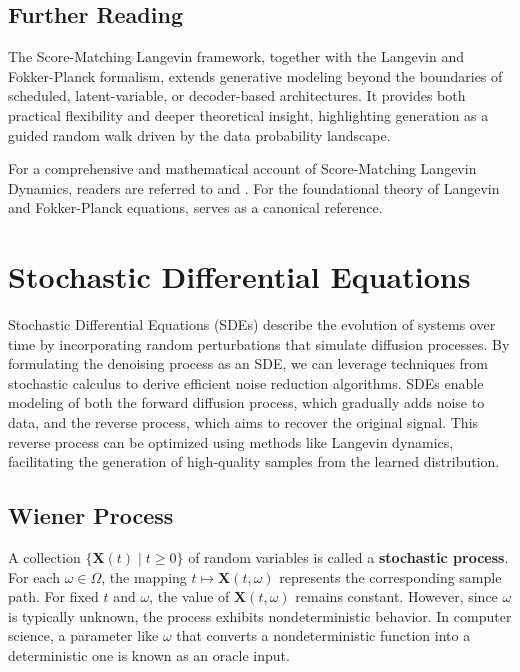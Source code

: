 \documentclass{article}
\newcommand{\X}{\mathbf{X}}
\begin{document}
	\subsection{Further Reading}
	
	The Score-Matching Langevin framework, together with the Langevin and Fokker-Planck formalism, extends generative modeling beyond the boundaries of scheduled, latent-variable, or decoder-based architectures. It provides both practical flexibility and deeper theoretical insight, highlighting generation as a guided random walk driven by the data probability landscape.
	
	For a comprehensive and mathematical account of Score-Matching Langevin Dynamics, readers are referred to \cite{vincent2011} and \cite{yang2019}. For the foundational theory of Langevin and Fokker-Planck equations, \cite{risken1989} serves as a canonical reference.
	
	\section{Stochastic Differential Equations}
	
	Stochastic Differential Equations (SDEs) describe the evolution of systems over time by incorporating random perturbations that simulate diffusion processes. By formulating the denoising process as an SDE, we can leverage techniques from stochastic calculus to derive efficient noise reduction algorithms. SDEs enable modeling of both the forward diffusion process, which gradually adds noise to data, and the reverse process, which aims to recover the original signal. This reverse process can be optimized using methods like Langevin dynamics, facilitating the generation of high-quality samples from the learned distribution.
	
	\subsection*{Wiener Process}
	
	A collection $\{\X(t) \mid t \geq 0\}$ of random variables is called a \textbf{stochastic process}. For each $\omega \in \Omega$, the mapping $t \mapsto \X(t, \omega)$ represents the corresponding sample path. For fixed $t$ and $\omega$, the value of $\X(t, \omega)$ remains constant. However, since $\omega$ is typically unknown, the process exhibits nondeterministic behavior. In computer science, a parameter like $\omega$ that converts a nondeterministic function into a deterministic one is known as an oracle input. \\
	
\end{document}
